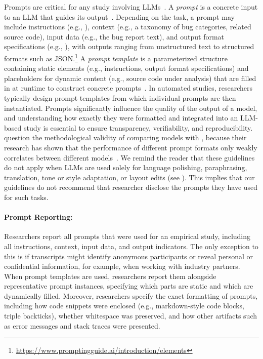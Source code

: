 
Prompts are critical for any study involving LLMs~\cite{DBLP:conf/iclr/Sclar0TS24}.
A \emph{prompt} is a concrete input to an LLM that guides its output~\cite{DBLP:journals/corr/abs-2406-06608}.
Depending on the task, a prompt may include instructions (e.g., ), context (e.g., a taxonomy of bug categories, related source code), input data (e.g., the bug report text), and output format specifications (e.g., ), with outputs ranging from unstructured text to structured formats such as JSON.\footnote{\url{https://www.promptingguide.ai/introduction/elements}}
A \emph{prompt template} is a parameterized structure containing static elements (e.g., instructions, output format specifications) and placeholders for dynamic content (e.g., source code under analysis) that are filled in at runtime to construct concrete prompts~\cite{DBLP:journals/corr/abs-2406-06608}.
In automated studies, researchers typically design prompt templates from which individual prompts are then instantiated.
Prompts significantly influence the quality of the output of a model, and understanding how exactly they were formatted and integrated into an LLM-based study is essential to ensure transparency, verifiability, and reproducibility.
\citeauthor{DBLP:conf/iclr/Sclar0TS24} question the methodological validity of comparing models with , because their research has shown that the performance of different prompt formats only weakly correlates between different models~\cite{DBLP:conf/iclr/Sclar0TS24}.
We remind the reader that these guidelines do not apply when LLMs are used solely for language polishing, paraphrasing, translation, tone or style adaptation, or layout edits (see \scope).
This implies that our guidelines do not recommend that researcher disclose the prompts they have used for such tasks.


\paragraph{Prompt Reporting:}
Researchers \must report all prompts that were used for an empirical study, including all instructions, context, input data, and output indicators.
The only exception to this is if transcripts might identify anonymous participants or reveal personal or confidential information, for example, when working with industry partners.
When prompt templates are used, researchers \must report them alongside representative prompt instances, specifying which parts are static and which are dynamically filled.
Moreover, researchers \should specify the exact formatting of prompts, including how code snippets were enclosed (e.g., markdown-style code blocks, triple backticks), whether whitespace was preserved, and how other artifacts such as error messages and stack traces were presented.

